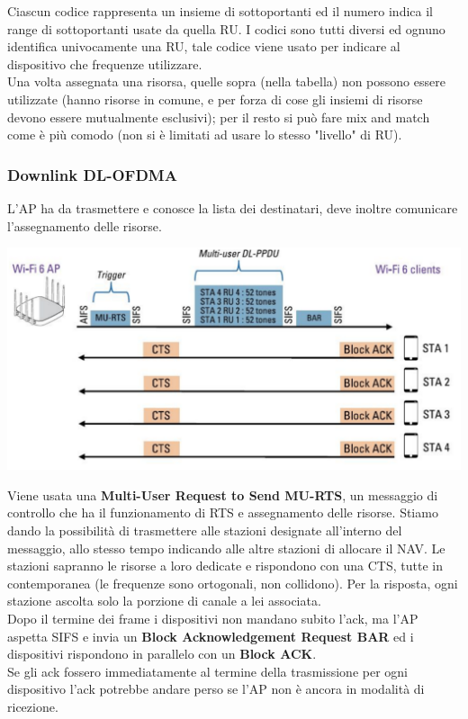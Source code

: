 Ciascun codice rappresenta un insieme di sottoportanti ed il numero indica il range di sottoportanti usate da quella RU. I codici sono tutti diversi ed ognuno identifica univocamente una RU, tale codice viene usato per indicare al dispositivo che frequenze utilizzare.\\
Una volta assegnata una risorsa, quelle sopra (nella tabella) non possono essere utilizzate (hanno risorse in comune, e per forza di cose gli insiemi di risorse devono essere mutualmente esclusivi); per il resto si può fare mix and match come è più comodo (non si è limitati ad usare lo stesso "livello" di RU).\\

\newpage

\subsubsection{Downlink DL-OFDMA}
L'AP ha da trasmettere e conosce la lista dei destinatari, deve inoltre comunicare l'assegnamento delle risorse. 
\begin{center}
	\includegraphics[width=0.85\linewidth]{img/wlan/downlink}
\end{center}

Viene usata una \textbf{Multi-User Request to Send MU-RTS}, un messaggio di controllo che ha il funzionamento di RTS e assegnamento delle risorse. Stiamo dando la possibilità di trasmettere alle stazioni designate all'interno del messaggio, allo stesso tempo indicando alle altre stazioni di allocare il NAV. Le stazioni sapranno le risorse a loro dedicate e rispondono con una CTS, tutte in contemporanea (le frequenze sono ortogonali, non collidono). Per la risposta, ogni stazione ascolta solo la porzione di canale a lei associata. \\

Dopo il termine dei frame i dispositivi non mandano subito l'ack, ma l'AP aspetta SIFS e invia un \textbf{Block Acknowledgement Request BAR} ed i dispositivi rispondono in parallelo con un \textbf{Block ACK}.\\
Se gli ack fossero immediatamente al termine della trasmissione per ogni dispositivo l'ack potrebbe andare perso se l'AP non è ancora in modalità di ricezione.\\

